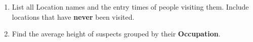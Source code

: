 \documentclass[12pt,a4paper]{article}
\begin{document}
\begin{enumerate}
    \item List all Location names and the entry times of people visiting them. Include locations that have \textbf{never} been visited.






    \item Find the average height of suspects grouped by their \textbf{Occupation}.


\end{enumerate}
\end{document}
